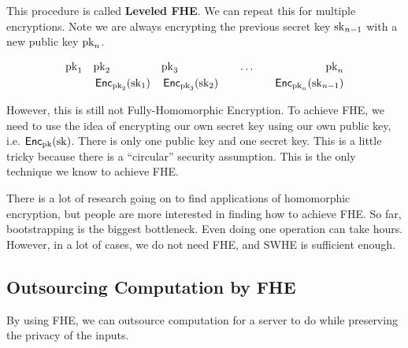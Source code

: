 \begin{center}
    \def\svgwidth{0.7\columnwidth}
    
\end{center}

This procedure is called \textbf{Leveled FHE}. We can repeat this for multiple encryptions. Note we are always encrypting the previous secret key $\mathrm{sk}_{n-1}$ with a new public key $\mathrm{pk}_n$.

\begin{align*}
    \mathrm{pk}_1 \quad & \mathrm{pk}_2  && \mathrm{pk}_3 &&& \dots &&&& \mathrm{pk}_n\\
    & \operatorname{\mathsf{Enc}}_{\mathrm{pk}_2}(\mathrm{sk}_1) && \operatorname{\mathsf{Enc}}_{\mathrm{pk}_3}(\mathrm{sk}_2) &&& &&&& \operatorname{\mathsf{Enc}}_{\mathrm{pk}_n}(\mathrm{sk}_{n-1})
\end{align*}

However, this is still not Fully-Homomorphic Encryption. To achieve FHE, we need to use the idea of encrypting our own secret key using our own public key, i.e. $\operatorname{\mathsf{Enc}}_{\mathrm{pk}}(\mathrm{sk})$. There is only one public key and one secret key. This is a little tricky because there is a ``circular'' security assumption. This is the only technique we know to achieve FHE.

There is a lot of research going on to find applications of homomorphic encryption, but people are more interested in finding how to achieve FHE. So far, bootstrapping is the biggest bottleneck. Even doing one operation can take hours. However, in a lot of cases, we do not need FHE, and SWHE is sufficient enough.

\subsection{Outsourcing Computation by FHE}

By using FHE, we can outsource computation for a server to do while preserving the privacy of the inputs.


